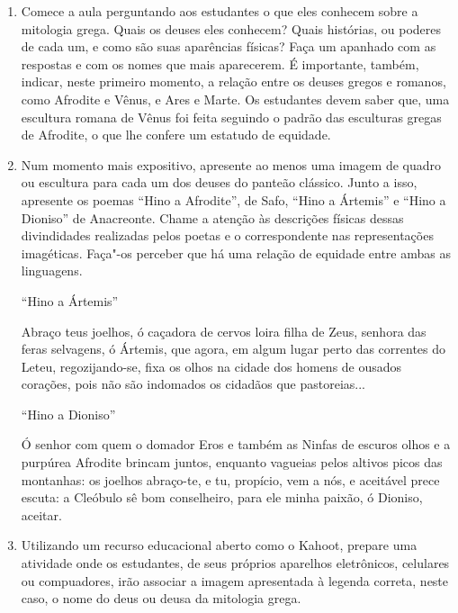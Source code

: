 \documentclass[12pt]{extarticle}
\begin{document}
\begin{enumerate}

	\item
	Comece a aula perguntando aos estudantes o que eles conhecem sobre 
	a mitologia grega. Quais os deuses eles conhecem? Quais histórias,
	ou poderes de cada um, e como são suas aparências físicas? Faça um apanhado
	com as respostas e com os nomes que mais aparecerem. É importante, também,
	indicar, neste primeiro momento, a relação entre os deuses gregos e romanos,
	como Afrodite e Vênus, e Ares e Marte. Os estudantes devem saber que, uma escultura
	romana de Vênus foi feita seguindo o padrão das esculturas gregas de Afrodite,
	o que lhe confere um estatudo de equidade. 

	\item
	Num momento mais expositivo, apresente ao menos uma imagem de quadro ou escultura
	para cada um dos deuses do panteão clássico.  Junto a isso, apresente os poemas
	``Hino a Afrodite'', de Safo, ``Hino a Ártemis'' e ``Hino a Dioniso'' de Anacreonte.
	Chame a atenção às descrições físicas dessas divindidades realizadas pelos poetas
	e o correspondente nas representações imagéticas. Faça"-os perceber que há uma
	relação de equidade entre ambas as linguagens. 

 	``Hino a Ártemis''

	Abraço teus joelhos, ó caçadora de cervos
	loira filha de Zeus, senhora 
	das feras selvagens, ó Ártemis,
	que agora, em algum lugar perto
	das correntes do Leteu, regozijando-se,
	fixa os olhos na cidade dos homens
	de ousados corações, pois não são indomados
	os cidadãos que pastoreias...

	``Hino a Dioniso''

	Ó senhor com quem o domador Eros
	e também as Ninfas de escuros olhos 
	e a purpúrea Afrodite
	brincam juntos, enquanto vagueias 
	pelos altivos picos das montanhas:
	os joelhos abraço-te, e tu, propício,
	vem a nós, e aceitável
	prece escuta:
	a Cleóbulo sê bom
	conselheiro, para ele minha paixão,
	ó Dioniso, aceitar. 

	\item
	Utilizando um recurso educacional aberto como o Kahoot, prepare uma atividade onde os
	estudantes, de seus próprios aparelhos eletrônicos, celulares ou compuadores, irão 
	associar a imagem apresentada à legenda correta, neste caso, o nome do deus ou deusa 
	da mitologia grega. 

\end{enumerate}
\end{document}
